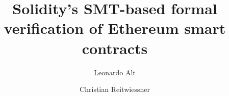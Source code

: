 \documentclass{llncs}
\begin{document}
\pagestyle{plain}

\title{Solidity's SMT-based formal verification of Ethereum smart contracts}

\author{Leonardo Alt \and Christian Reitwiessner}
\maketitle











\end{document}
